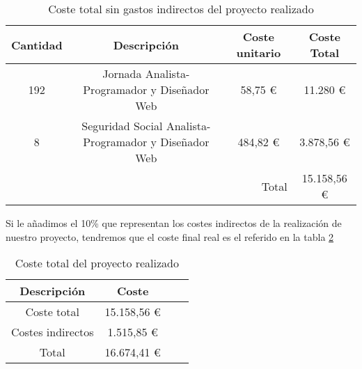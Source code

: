 \begin{table}[H]
  \begin{center}
    \begin{tabular}{| c | c | c | c |}
      \hline
      Cantidad & Descripción & Coste unitario & Coste Total\\ \hline
      192 & Jornada Analista-Programador y Diseñador Web & 58,75 \euro &
      11.280 \euro\\ \hline
      8 & Seguridad Social Analista-Programador y Diseñador Web & 484,82
      \euro & 3.878,56 \euro \\ \hline
      \multicolumn{3}{|r|}{Total} &  15.158,56 \euro\\
      \hline
    \end{tabular}
  \end{center}
  \caption{Coste total sin gastos indirectos del proyecto realizado}
  \label{tab:coste}
\end{table}

Si le añadimos el 10\% que representan los costes indirectos de la realización
de nuestro proyecto, tendremos que el coste final real es el referido en la
tabla \ref{tab:coste_indirectos}

\begin{table}[H]
  \begin{center}
    \begin{tabular}{| c | c | c | c |}
      \hline
      Descripción & Coste \\ \hline
      Coste total & 15.158,56 \euro\\ \hline
      Costes indirectos & 1.515,85 \euro \\ \hline
      Total &  16.674,41 \euro\\
      \hline
    \end{tabular}
  \end{center}
  \caption{Coste total del proyecto realizado}
  \label{tab:coste_indirectos}
\end{table}